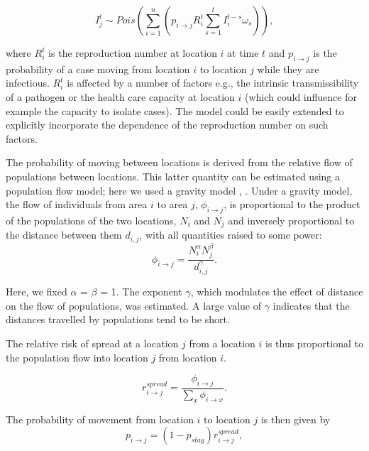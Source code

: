 \documentclass[9pt,twocolumn,twoside,lineno]{pnas-new}
\begin{document}
{\begin{equation}
  I_{j}^{t} \sim 
  Pois\left( 
  \sum_{i = 1}^{n} 
  {\left( p_{i \rightarrow j}
  R_{i}^{t} \sum_{s = 1}^{t}{I_{i}^{t - s} \omega_{s}}
  \right)} 
  \right),
  \label{eq:likelihood}
\end{equation}

where \(R_{i}^{t}\) is the reproduction number at location \(i\) at time
\(t\) and \(p_{i \rightarrow j}\) is the probability of a case moving
from location \(i\) to location \(j\) while they are infectious.
\(R_{i}^{t}\) is affected by a number of factors e.g., the intrinsic
transmissibility of a pathogen or the health care capacity at location
\(i\) (which could influence for example the capacity to isolate cases).
The model could be easily extended to explicitly incorporate the
dependence of the reproduction number on such factors.

The probability of moving between locations is derived from the relative
flow of populations between locations. This latter quantity can be
estimated using a population flow model; here we used a gravity model
\cite{grosche2007175}, \cite{zipf1946p}. Under a gravity model, the flow
of individuals from area \(i\) to area \(j\),
\(\phi_{i \rightarrow j}\), is proportional to the product of the
populations of the two locations, \(N_i\) and \(N_j\) and inversely
proportional to the distance between them \(d_{i, j}\), with all
quantities raised to some power: \begin{equation*}
  \phi_{i \rightarrow j} =  \frac{N_i^{\alpha}N_j^{\beta}}{d_{i, j}^{\gamma}}.
\end{equation*}

Here, we fixed \(\alpha\) = \(\beta\) = 1. The exponent \(\gamma\),
which modulates the effect of distance on the flow of populations, was
estimated. A large value of \(\gamma\) indicates that the distances
travelled by populations tend to be short.

The relative risk of spread at a location \(j\) from a location \(i\) is
thus proportional to the population flow into location \(j\) from
location \(i\).

\begin{equation*}
  r_{i \rightarrow j}^{spread} = \frac{\phi_{i \rightarrow
  j}}{\sum_{x}{\phi_{i \rightarrow
  x}}}.
\end{equation*}

The probability of movement from location \(i\) to location \(j\) is
then given by \begin{equation*} 
p_{i \rightarrow j} = (1 - p_{stay}) r_{i \rightarrow j}^{spread},
\end{equation*}

}
\end{document}

